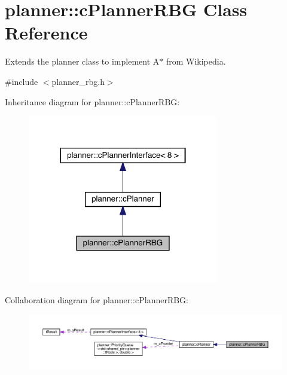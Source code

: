 \hypertarget{classplanner_1_1c_planner_r_b_g}{}\section{planner\+:\+:c\+Planner\+R\+BG Class Reference}
\label{classplanner_1_1c_planner_r_b_g}


Extends the planner class to implement A$\ast$ from Wikipedia.  




{\ttfamily \#include $<$planner\+\_\+rbg.\+h$>$}



Inheritance diagram for planner\+:\+:c\+Planner\+R\+BG\+:\nopagebreak
\begin{figure}[H]
\begin{center}
\leavevmode
\includegraphics[width=236pt]{classplanner_1_1c_planner_r_b_g__inherit__graph}
\end{center}
\end{figure}


Collaboration diagram for planner\+:\+:c\+Planner\+R\+BG\+:\nopagebreak
\begin{figure}[H]
\begin{center}
\leavevmode
\includegraphics[width=350pt]{classplanner_1_1c_planner_r_b_g__coll__graph}
\end{center}
\end{figure}
